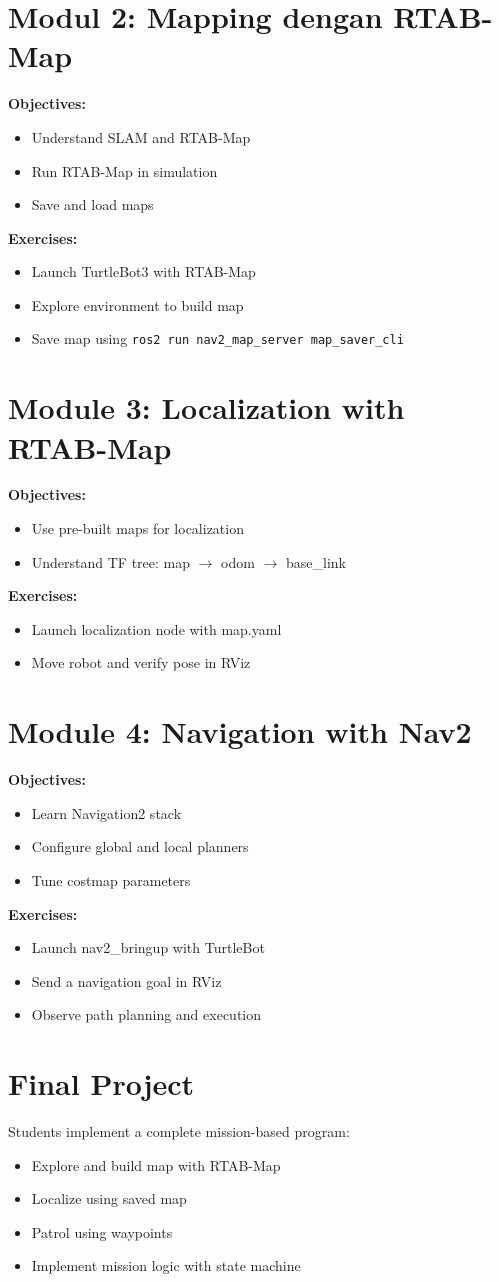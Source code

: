\documentclass{article}
\begin{document}
\section{Modul 2: Mapping dengan RTAB-Map}
\textbf{Objectives:}
\begin{itemize}
  \item Understand SLAM and RTAB-Map
  \item Run RTAB-Map in simulation
  \item Save and load maps
\end{itemize}
\textbf{Exercises:}
\begin{itemize}
  \item Launch TurtleBot3 with RTAB-Map
  \item Explore environment to build map
  \item Save map using \texttt{ros2 run nav2\_map\_server map\_saver\_cli}
\end{itemize}

\section{Module 3: Localization with RTAB-Map}
\textbf{Objectives:}
\begin{itemize}
  \item Use pre-built maps for localization
  \item Understand TF tree: map $\rightarrow$ odom $\rightarrow$ base\_link
\end{itemize}
\textbf{Exercises:}
\begin{itemize}
  \item Launch localization node with map.yaml
  \item Move robot and verify pose in RViz
\end{itemize}

\section{Module 4: Navigation with Nav2}
\textbf{Objectives:}
\begin{itemize}
  \item Learn Navigation2 stack
  \item Configure global and local planners
  \item Tune costmap parameters
\end{itemize}
\textbf{Exercises:}
\begin{itemize}
  \item Launch nav2\_bringup with TurtleBot
  \item Send a navigation goal in RViz
  \item Observe path planning and execution
\end{itemize}

\section*{Final Project}
Students implement a complete mission-based program:
\begin{itemize}
  \item Explore and build map with RTAB-Map
  \item Localize using saved map
  \item Patrol using waypoints
  \item Implement mission logic with state machine
\end{itemize}
\end{document}
